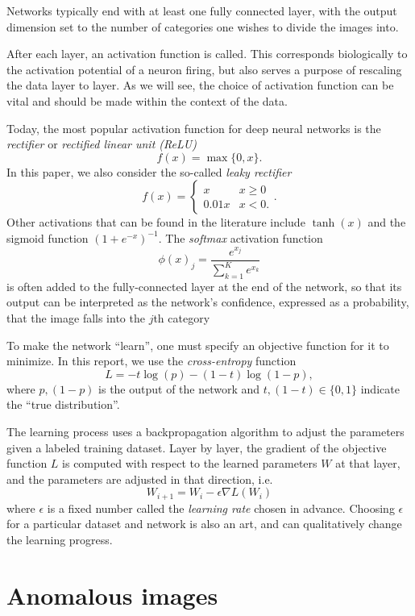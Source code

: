 \documentclass{article}
\begin{document}
  Networks typically end with at least one fully connected layer, with the output dimension set to the number of categories one wishes to divide the images into.

  After each layer, an activation function is called. This corresponds biologically to the activation potential of a neuron firing, but also serves a purpose of rescaling the data layer to layer. As we will see, the choice of activation function can be vital and should be made within the context of the data.

  Today, the most popular activation function for deep neural networks is the \emph{rectifier} or \emph{rectified linear unit (ReLU)}~\cite{lecun2015}
  \[ f(x) = \max \{0, x\}. \]
  In this paper, we also consider the so-called \emph{leaky rectifier}~\cite{leakyrectify}
  \[ f(x) = \begin{cases} x & x \geq 0 \\ 0.01 x & x < 0. \end{cases}. \]
  Other activations that can be found in the literature include $\tanh(x)$ and the sigmoid function ${(1+e^{-x})}^{-1}$.
  The \emph{softmax} activation function
  \[ {\phi(x)}_j=\frac{e^{x_j}}{\sum_{k=1}^K e^{x_k}} \]
  is often added to the fully-connected layer at the end of the network, so that its output can be interpreted as the network's confidence, expressed as a probability, that the image falls into the $j$th category

  To make the network ``learn'', one must specify an objective function for it to minimize. In this report, we use the \emph{cross-entropy} function
  \[ L = - t \log(p) - (1-t) \log(1-p), \]
  where $p, (1-p)$ is the output of the network and $t, (1-t)\in \{0,1\}$ indicate the ``true distribution''.

  The learning process uses a backpropagation algorithm to adjust the parameters given a labeled training dataset. Layer by layer, the gradient of the objective function $L$ is computed with respect to the learned parameters $W$ at that layer, and the parameters are adjusted in that direction, i.e.
  \[ W_{i+1}=W_i-\epsilon\nabla L(W_i) \]
  where $\epsilon$ is a fixed number called the \emph{learning rate} chosen in advance. Choosing $\epsilon$ for a particular dataset and network is also an art, and can qualitatively change the learning progress.


\section{Anomalous images}
\end{document}
